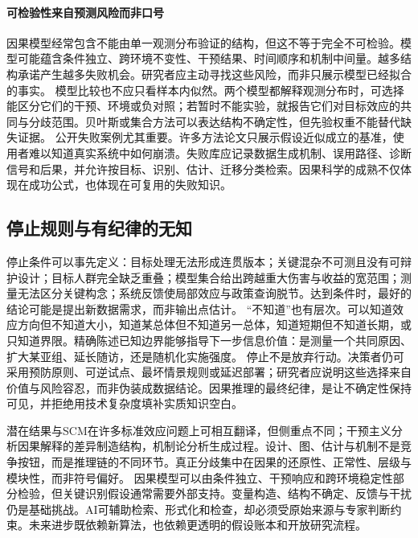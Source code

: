 \paragraph{可检验性来自预测风险而非口号}

因果模型经常包含不能由单一观测分布验证的结构，但这不等于完全不可检验。模型可能蕴含条件独立、跨环境不变性、干预结果、时间顺序和机制中间量。越多结构承诺产生越多失败机会。研究者应主动寻找这些风险，而非只展示模型已经拟合的事实。
模型比较也不应只看样本内似然。两个模型都解释观测分布时，可选择能区分它们的干预、环境或负对照；若暂时不能实验，就报告它们对目标效应的共同与分歧范围。贝叶斯或集合方法可以表达结构不确定性，但先验权重不能替代缺失证据。
公开失败案例尤其重要。许多方法论文只展示假设近似成立的基准，使用者难以知道真实系统中如何崩溃。失败库应记录数据生成机制、误用路径、诊断信号和后果，并允许按目标、识别、估计、迁移分类检索。因果科学的成熟不仅体现在成功公式，也体现在可复用的失败知识。

\subsection{停止规则与有纪律的无知}

停止条件可以事先定义：目标处理无法形成连贯版本；关键混杂不可测且没有可辩护设计；目标人群完全缺乏重叠；模型集合给出跨越重大伤害与收益的宽范围；测量无法区分关键构念；系统反馈使局部效应与政策查询脱节。达到条件时，最好的结论可能是提出新数据需求，而非输出点估计。
“不知道”也有层次。可以知道效应方向但不知道大小，知道某总体但不知道另一总体，知道短期但不知道长期，或只知道界限。精确陈述已知边界能够指导下一步信息价值：是测量一个共同原因、扩大某亚组、延长随访，还是随机化实施强度。
停止不是放弃行动。决策者仍可采用预防原则、可逆试点、最坏情景规则或延迟部署；研究者应说明这些选择来自价值与风险容忍，而非伪装成数据结论。因果推理的最终纪律，是让不确定性保持可见，并拒绝用技术复杂度填补实质知识空白。

\begin{chapterreview}
潜在结果与SCM在许多标准效应问题上可相互翻译，但侧重点不同；干预主义分析因果解释的差异制造结构，机制论分析生成过程。设计、图、估计与机制不是竞争按钮，而是推理链的不同环节。真正分歧集中在因果的还原性、正常性、层级与模块性，而非符号偏好。 因果模型可以由条件独立、干预响应和跨环境稳定性部分检验，但关键识别假设通常需要外部支持。变量构造、结构不确定、反馈与干扰仍是基础挑战。AI可辅助检索、形式化和检查，却必须受原始来源与专家判断约束。未来进步既依赖新算法，也依赖更透明的假设账本和开放研究流程。
\end{chapterreview}

